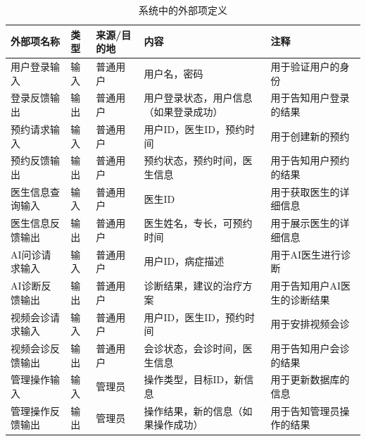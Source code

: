 \begin{table}[htbp]
	\centering
	\begin{tabular}{|l|l|l|p{4cm}|p{4cm}|}
		\hline
		\textbf{外部项名称} & \textbf{类型} & \textbf{来源/目的地} & \textbf{内容} & \textbf{注释} \\
		\hline
		用户登录输入 & 输入 & 普通用户 & 用户名，密码 & 用于验证用户的身份 \\
		登录反馈输出 & 输出 & 普通用户 & 用户登录状态，用户信息（如果登录成功） & 用于告知用户登录的结果 \\
		预约请求输入 & 输入 & 普通用户 & 用户ID，医生ID，预约时间 & 用于创建新的预约 \\
		预约反馈输出 & 输出 & 普通用户 & 预约状态，预约时间，医生信息 & 用于告知用户预约的结果 \\
		医生信息查询输入 & 输入 & 普通用户 & 医生ID & 用于获取医生的详细信息 \\
		医生信息反馈输出 & 输出 & 普通用户 & 医生姓名，专长，可预约时间 & 用于展示医生的详细信息 \\
		AI问诊请求输入 & 输入 & 普通用户 & 用户ID，病症描述 & 用于AI医生进行诊断 \\
		AI诊断反馈输出 & 输出 & 普通用户 & 诊断结果，建议的治疗方案 & 用于告知用户AI医生的诊断结果 \\
		视频会诊请求输入 & 输入 & 普通用户 & 用户ID，医生ID，预约时间 & 用于安排视频会诊 \\
		视频会诊反馈输出 & 输出 & 普通用户 & 会诊状态，会诊时间，医生信息 & 用于告知用户会诊的结果 \\
		管理操作输入 & 输入 & 管理员 & 操作类型，目标ID，新信息 & 用于更新数据库的信息 \\
		管理操作反馈输出 & 输出 & 管理员 & 操作结果，新的信息（如果操作成功） & 用于告知管理员操作的结果 \\
		\hline
	\end{tabular}
	\caption{系统中的外部项定义}
	\label{tab:external_entities}
\end{table}
\newpage

